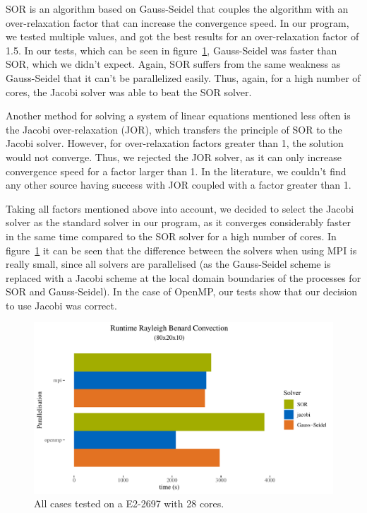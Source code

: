 \documentclass{article}%
\begin{document}
SOR is an algorithm based on Gauss-Seidel that couples the algorithm with an over-relaxation factor that can increase the convergence speed. In our program, we tested multiple values, and got the best results for an over-relaxation factor of 1.5. In our tests, which can be seen in figure~\ref{fig:solver}, Gauss-Seidel was faster than SOR, which we didn't expect. Again, SOR suffers from the same weakness as Gauss-Seidel that it can’t be parallelized easily. Thus, again, for a high number of cores, the Jacobi solver was able to beat the SOR solver.

Another method for solving a system of linear equations mentioned less often is the Jacobi over-relaxation (JOR), which transfers the principle of SOR to the Jacobi solver. However, for over-relaxation factors greater than 1, the solution would not converge. Thus, we rejected the JOR solver, as it can only increase convergence speed for a factor larger than 1. In the literature, we couldn’t find any other source having success with JOR coupled with a factor greater than 1.

Taking all factors mentioned above into account, we decided to select the Jacobi solver as the standard solver in our program, as it converges considerably faster in the same time compared to the SOR solver for a high number of cores. In figure~\ref{fig:solver} it can be seen that the difference between the solvers when using MPI is really small, since all solvers are parallelised (as the Gauss-Seidel scheme is replaced with a Jacobi scheme at the local domain boundaries of the processes for SOR and Gauss-Seidel). In the case of OpenMP, our tests show that our decision to use Jacobi was correct.

\begin{figure}[htb]
\centering
\includegraphics[width=1\linewidth]{../tests/graphs/runtime_rayleigh_benard_convection_8-2-1_solver.pdf}
\caption{All cases tested on a E2-2697 with 28 cores.}
\label{fig:solver}
\end{figure}
\end{document}
